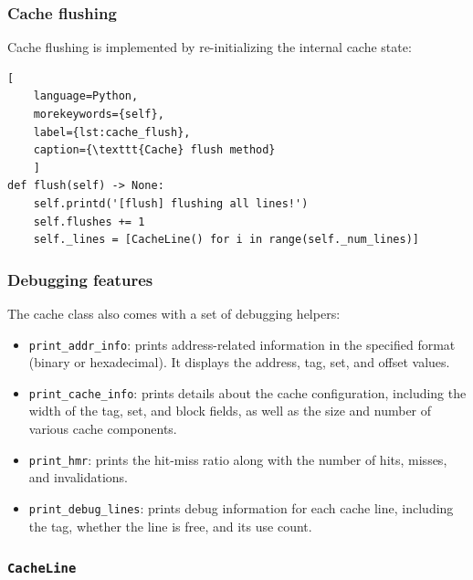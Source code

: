 \subsubsection*{Cache flushing}
\noindent Cache flushing is implemented by re-initializing the internal cache state:

\begin{center}
\centering
\begin{minipage}{\linewidth}
\begin{lstlisting}[
    language=Python,
	morekeywords={self},
    label={lst:cache_flush},
    caption={\texttt{Cache} flush method}
    ]
def flush(self) -> None:
    self.printd('[flush] flushing all lines!')
    self.flushes += 1
    self._lines = [CacheLine() for i in range(self._num_lines)]
\end{lstlisting}
\end{minipage}
\end{center}

\subsubsection*{Debugging features}
\noindent The cache class also comes with a set of debugging helpers:
\begin{itemize}
    \item \texttt{print\_addr\_info}: prints address-related information in the specified format (binary or hexadecimal). It displays the address, tag, set, and offset values.
    \item \texttt{print\_cache\_info}: prints details about the cache configuration, including the width of the tag, set, and block fields, as well as the size and number of various cache components.
    \item \texttt{print\_hmr}: prints the hit-miss ratio along with the number of hits, misses, and invalidations.
    \item \texttt{print\_debug\_lines}: prints debug information for each cache line, including the tag, whether the line is free, and its use count.
\end{itemize}

\subsubsection{\texttt{CacheLine}}

